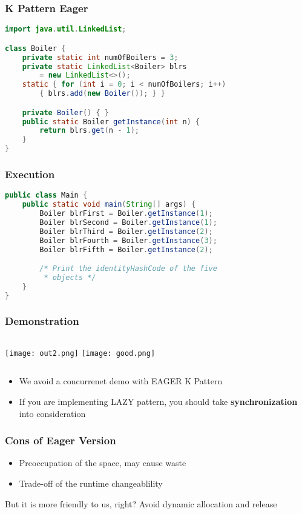 \documentclass{beamer}
\begin{document}
\begin{frame}[fragile]
\frametitle{K Pattern Eager}
\begin{small}
\begin{lstlisting}[language=java]
import java.util.LinkedList;

class Boiler {
    private static int numOfBoilers = 3;
    private static LinkedList<Boiler> blrs
        = new LinkedList<>();
    static { for (int i = 0; i < numOfBoilers; i++)
        { blrs.add(new Boiler()); } }

    private Boiler() { }
    public static Boiler getInstance(int n) {
        return blrs.get(n - 1);
    }
}
\end{lstlisting}
\end{small}
\end{frame}

\begin{frame}[fragile]
\frametitle{Execution}
\begin{small}
\begin{lstlisting}[language=java]
public class Main {
    public static void main(String[] args) {
        Boiler blrFirst = Boiler.getInstance(1);
        Boiler blrSecond = Boiler.getInstance(1);
        Boiler blrThird = Boiler.getInstance(2);
        Boiler blrFourth = Boiler.getInstance(3);
        Boiler blrFifth = Boiler.getInstance(2);

        /* Print the identityHashCode of the five
         * objects */
    }
}
\end{lstlisting}
\end{small}
\end{frame}

\begin{frame}
\frametitle{Demonstration}
\begin{columns}
\column{ 3.5in }
\texttt{[image: out2.png]}
\column{ 2.0in }
\texttt{[image: good.png]}
\end{columns}
\begin{itemize}
    \item We avoid a concurrenet demo with EAGER K Pattern
    \item If you are implementing LAZY pattern,
        you should take \textbf{synchronization} into consideration
\end{itemize}
\end{frame}


\begin{frame}
    \frametitle{Cons of Eager Version}
    \begin{itemize}
        \item Preoccupation of the space, may cause waste
        \item Trade-off of the runtime changeablility
    \end{itemize}
    But it is more friendly to us, right? Avoid dynamic allocation and release
\end{frame}
\end{document}
